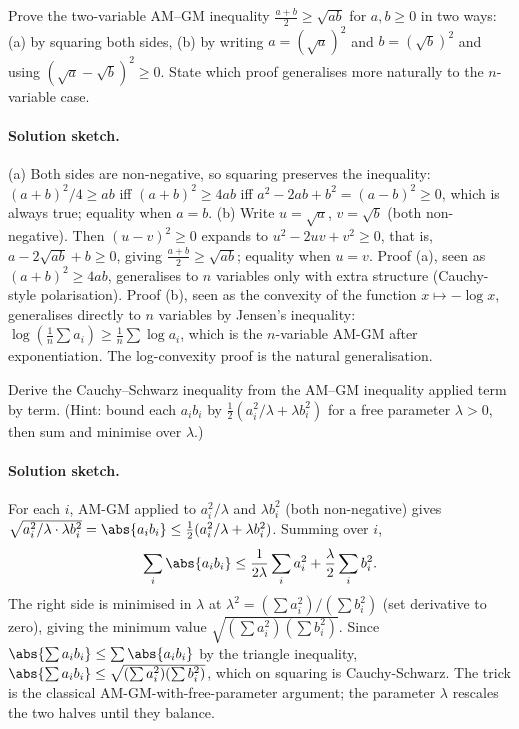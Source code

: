 \begin{exercise}
Prove the two-variable AM--GM inequality $\frac{a + b}{2} \geq
\sqrt{ab}$ for $a, b \geq 0$ in two ways: (a) by squaring both
sides, (b) by writing $a = (\sqrt{a})^{2}$ and $b = (\sqrt{b})^{2}$
and using $(\sqrt{a} - \sqrt{b})^{2} \geq 0$. State which proof
generalises more naturally to the $n$-variable case.

\paragraph{Solution sketch.}
(a) Both sides are non-negative, so squaring preserves the
inequality: $(a + b)^{2}/4 \geq ab$ iff $(a + b)^{2} \geq 4 ab$ iff
$a^{2} - 2 ab + b^{2} = (a - b)^{2} \geq 0$, which is always true;
equality when $a = b$.
(b) Write $u = \sqrt{a}$, $v = \sqrt{b}$ (both non-negative). Then
$(u - v)^{2} \geq 0$ expands to $u^{2} - 2 u v + v^{2} \geq 0$, that
is, $a - 2 \sqrt{ab} + b \geq 0$, giving $\tfrac{a + b}{2} \geq
\sqrt{ab}$; equality when $u = v$.
Proof (a), seen as $(a + b)^{2} \geq 4 ab$, generalises to $n$
variables only with extra structure (Cauchy-style polarisation).
Proof (b), seen as the convexity of the function $x \mapsto -\log
x$, generalises directly to $n$ variables by Jensen's inequality:
$\log(\tfrac{1}{n}\sum a_{i}) \geq \tfrac{1}{n} \sum \log a_{i}$,
which is the $n$-variable AM-GM after exponentiation. The
log-convexity proof is the natural generalisation.
\end{exercise}

\begin{exercise}
Derive the Cauchy--Schwarz inequality from the AM--GM inequality
applied term by term. (Hint: bound each $a_{i} b_{i}$ by
$\tfrac{1}{2}(a_{i}^{2}/\lambda + \lambda b_{i}^{2})$ for a free
parameter $\lambda > 0$, then sum and minimise over $\lambda$.)

\paragraph{Solution sketch.}
For each $i$, AM-GM applied to $a_{i}^{2}/\lambda$ and $\lambda
b_{i}^{2}$ (both non-negative) gives $\sqrt{a_{i}^{2}/\lambda \cdot
\lambda b_{i}^{2}} = \abs{a_{i} b_{i}} \leq \tfrac{1}{2}(a_{i}^{2}/
\lambda + \lambda b_{i}^{2})$. Summing over $i$,
\[
\sum_{i} \abs{a_{i} b_{i}} \leq \frac{1}{2 \lambda} \sum_{i}
a_{i}^{2} + \frac{\lambda}{2} \sum_{i} b_{i}^{2}.
\]
The right side is minimised in $\lambda$ at $\lambda^{2} = (\sum
a_{i}^{2}) / (\sum b_{i}^{2})$ (set derivative to zero), giving the
minimum value $\sqrt{(\sum a_{i}^{2})(\sum b_{i}^{2})}$. Since
$\abs{\sum a_{i} b_{i}} \leq \sum \abs{a_{i} b_{i}}$ by the triangle
inequality, $\abs{\sum a_{i} b_{i}} \leq \sqrt{(\sum a_{i}^{2})(\sum
b_{i}^{2})}$, which on squaring is Cauchy-Schwarz. The trick is the
classical AM-GM-with-free-parameter argument; the parameter
$\lambda$ rescales the two halves until they balance.
\end{exercise}

